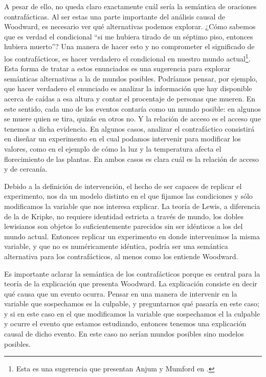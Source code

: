 A pesar de ello, no queda claro exactamente cuál sería la semántica de oraciones contrafácticas. Al ser estas una parte importante del análisis causal de Woodward, es necesario ver qué alternativas podemos explorar. ¿Cómo sabemos que es verdad el condicional ``si me hubiera tirado de un séptimo piso, entonces hubiera muerto''? Una manera de hacer esto y no comprometer el significado de los contrafácticos, es hacer verdadero el condicional en nuestro mundo actual\footnote{Esta es una sugerencia que presentan Anjum y Mumford en \cite{Mumford2013}.}. Esta forma de tratar a estos enunciados es una sugerencia para explorar semánticas alternativas a la de mundos posibles. Podríamos pensar, por ejemplo, que hacer verdadero el enunciado es analizar la información que hay disponible acerca de caídas a esa altura y contar el procentaje de personas que mueren. En este sentido, cada uno de los eventos contaría como un mundo posible: en algunos se muere quien se tira, quizás en otros no. Y la relación de acceso es el acceso que tenemos a dicha evidencia. En algunos casos, analizar el contrafáctico consistirá en diseñar un experimento en el cual podamos intervenir para modificar los valores, como en el ejemplo de cómo la luz y la temperatura afecta el florecimiento de las plantas. En ambos casos es clara cuál es la relación de acceso y de cercanía.

Debido a la definición de intervención, el hecho de ser capaces de replicar el experimento, nos da un modelo distinto en el que fijamos las condiciones y sólo modificamos la variable que nos interesa explicar. La teoría de Lewis, a diferencia de la de Kripke, no requiere identidad estricta a través de mundo, los dobles lewisianos son objetos lo suficientemente parecidos sin ser idénticos a los del mundo actual. Entonces replicar un experimento en donde intervenimos la misma variable, y que no es numéricamente idéntica, podría ser una semántica alternativa para los contrafácticos, al menos como los entiende Woodward.

Es importante aclarar la semántica de los contrafácticos porque es central para la teoría de la explicación que presenta Woodward. La explicación consiste en decir qué causa que un evento ocurra. Pensar en una manera de intervenir en la variable que sospechamos es la culpable, y preguntarnos qué pasaría en este caso; y si en este caso en el que modificamos la variable que sospechamos el la culpable y ocurre el evento que estamos estudiando, entonces tenemos una explicación causal de dicho evento. En este caso no serían mundos posibles sino modelos posibles.

